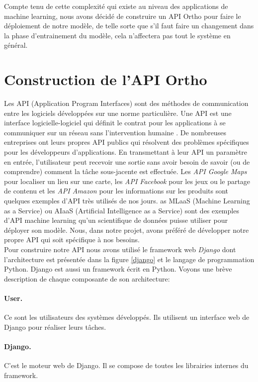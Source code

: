 \documentclass[12pt, french]{report}
\begin{document}
Compte tenu de cette complexité qui existe au niveau des applications de machine learning, nous avons décidé de construire un API Ortho pour faire le déploiement de notre modèle, de telle sorte que s'il faut faire un changement dans la phase d'entrainement du modèle, cela n'affectera pas tout le système en général.  

\section{Construction de l'API Ortho}

Les API (Application Program Interfaces) sont des méthodes de communication entre les logiciels développées sur une norme particulière. Une API est une interface logicielle-logiciel qui définit le contrat pour les applications à se communiquer sur un réseau sans l'intervention humaine \cite{key49}.  De nombreuses entreprises ont leurs propres API publics qui résolvent des problèmes spécifiques pour les développeurs d'applications. En transmettant à leur API un paramètre en entrée, l'utilisateur peut recevoir une sortie sans avoir besoin de savoir (ou de comprendre) comment la tâche sous-jacente est effectuée. Les\textit{ API Google Maps} pour localiser un lieu sur une carte, les \textit{API Facebook} pour les jeux ou le partage de contenu et les \textit{API Amazon} pour les informations sur les produits sont quelques exemples d'API très utilisés de nos jours. as MLaaS (Machine Learning as a Service) ou AIaaS (Artificial Intelligence as a Service) sont des exemples d'API machine learning qu'un scientifique de données puisse utiliser pour déployer son modèle. Nous, dans notre projet, avons préféré de développer notre propre API qui soit spécifique à nos besoins. \\

Pour construire notre API nous avons utilisé le framework web \textit{Django}  dont l'architecture est présentée dans la figure \ref{django} et le langage de programmation Python. Django est aussi un framework écrit en Python. Voyons une brève description de chaque composante de son architecture:
\paragraph{User.} Ce sont les utilisateurs des systèmes développés. Ils utilisent un interface web de Django pour réaliser leurs tâches.
\paragraph{Django.} C'est le moteur web de Django. Il se compose de toutes les librairies internes du framework.
\end{document}
